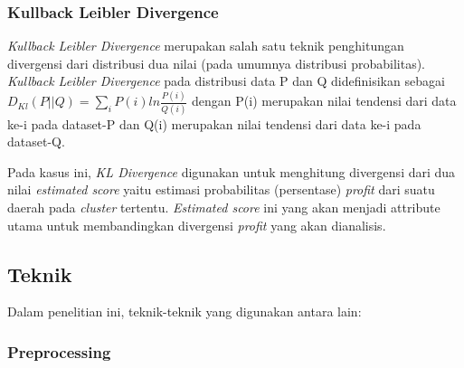 \documentclass{article}
\begin{document}
\subsubsection{Kullback Leibler Divergence}
\begin{adjustwidth}{4em}{0pt}
\hspace{\parindent}\textit{Kullback Leibler Divergence} merupakan salah satu teknik penghitungan divergensi dari distribusi dua nilai (pada umumnya distribusi probabilitas). \textit{Kullback Leibler Divergence} pada distribusi data  P dan Q  didefinisikan sebagai 
$D_{Kl}(P||Q) = \sum\limits_{i}P(i)ln\frac{P(i)}{Q(i)}$
dengan P(i) merupakan nilai tendensi dari data ke-i pada dataset-P dan Q(i) merupakan nilai tendensi dari data ke-i pada dataset-Q.

Pada kasus ini, \textit{KL Divergence} digunakan untuk menghitung divergensi dari dua nilai \textit{estimated score} yaitu estimasi probabilitas (persentase) \textit{profit} dari suatu daerah pada \textit{cluster} tertentu. \textit{Estimated score} ini  yang akan menjadi attribute utama untuk membandingkan divergensi \textit{profit} yang akan dianalisis.

\end{adjustwidth}

\subsection{Teknik}

\begin{adjustwidth}{2em}{0pt}

\hspace{\parindent}Dalam penelitian ini, teknik-teknik yang digunakan antara lain:

\end{adjustwidth}

\subsubsection{Preprocessing}
\end{document}
